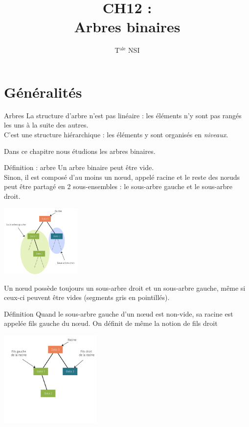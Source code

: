 \documentclass[10pt]{nsibeamer}
\title{CH12 : \\Arbres binaires}
\author{T$^{\text{ale}}$ NSI}
\begin{document}
\maketitle
\section{Généralités}
\begin{frame}{Arbres}
    La structure d'arbre n'est pas linéaire : les éléments n'y sont pas rangés les uns à la suite des autres.\\\pause
     C'est une structure \alert{hiérarchique} : les éléments y sont organisés en \textit{niveaux}.\\\pause
    
    Dans ce chapitre nous étudions les \alert{arbres binaires}.
\end{frame}

\begin{frame}{Définition : arbre}
    Un arbre binaire peut être vide.\\
    \pause
    Sinon, il est composé d'au moins un n\oe ud, appelé \alert{racine} et le reste des n\oe uds peut être partagé en 2 sous-ensembles : \pause le \alert{sous-arbre gauche} et le \alert{sous-arbre droit}.\pause
    \begin{center}
        \includegraphics[width=4cm]{img/arbre_bin_1}
    \end{center}\pause
Un n\oe ud possède toujours un sous-arbre droit et un sous-arbre gauche, même si ceux-ci peuvent être vides (segments gris en pointillés).
\end{frame}

\begin{frame}{Définition}
    Quand le sous-arbre gauche d'un n\oe ud est non-vide, sa racine est appelée \alert{fils gauche} du n\oe ud. On définit de même la notion de \alert{fils droit}
    \begin{center}
        \includegraphics[width=5cm]{img/arbre_bin_2}
    \end{center}
\end{frame}
\end{document}
